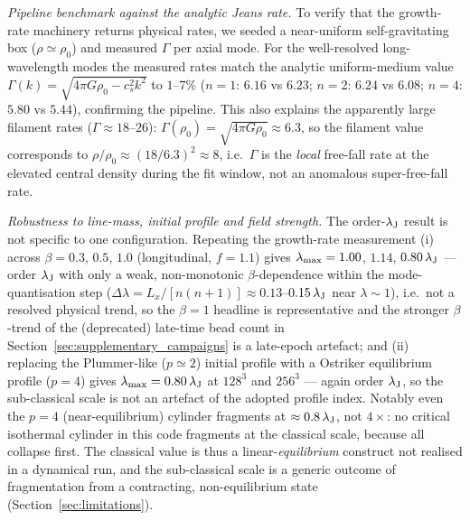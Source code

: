 \documentclass[usenatbib,twoside,twocolumn]{mnras}
\begin{document}
\emph{Pipeline benchmark against the analytic Jeans rate.} To verify that the growth-rate machinery returns physical rates, we seeded a near-uniform self-gravitating box ($\rho\simeq\rho_0$) and measured $\Gamma$ per axial mode. For the well-resolved long-wavelength modes the measured rates match the analytic uniform-medium value $\Gamma(k)=\sqrt{4\pi G\rho_0-c_s^2k^2}$ to $1$--$7\%$ ($n{=}1$: $6.16$ vs $6.23$; $n{=}2$: $6.24$ vs $6.08$; $n{=}4$: $5.80$ vs $5.44$), confirming the pipeline. This also explains the apparently large filament rates ($\Gamma\approx18$--$26$): $\Gamma(\rho_0)=\sqrt{4\pi G\rho_0}\approx6.3$, so the filament value corresponds to $\rho/\rho_0\approx(18/6.3)^2\approx8$, i.e.\ $\Gamma$ is the \emph{local} free-fall rate at the elevated central density during the fit window, not an anomalous super-free-fall rate.

\emph{Robustness to line-mass, initial profile and field strength.} The order-$\lambda_{\rm J}$ result is not specific to one configuration. Repeating the growth-rate measurement (i) across $\beta=0.3$, $0.5$, $1.0$ (longitudinal, $f=1.1$) gives $\lambda_{\rm max}=1.00$, $1.14$, $0.80\,\lambda_{\rm J}$ --- order $\lambda_{\rm J}$ with only a weak, non-monotonic $\beta$-dependence within the mode-quantisation step ($\Delta\lambda=L_x/[n(n{+}1)]\approx0.13$--$0.15\,\lambda_{\rm J}$ near $\lambda\sim1$), i.e.\ not a resolved physical trend, so the $\beta=1$ headline is representative and the stronger $\beta$-trend of the (deprecated) late-time bead count in Section~\ref{sec:supplementary_campaigns} is a late-epoch artefact; and (ii) replacing the Plummer-like ($p\simeq2$) initial profile with a Ostriker equilibrium profile ($p=4$) gives $\lambda_{\rm max}=0.80\,\lambda_{\rm J}$ at $128^3$ and $256^3$ --- again order $\lambda_{\rm J}$, so the sub-classical scale is not an artefact of the adopted profile index. Notably even the $p=4$ (near-equilibrium) cylinder fragments at $\approx0.8\,\lambda_{\rm J}$, not $4\times$: no critical isothermal cylinder in this code fragments at the classical scale, because all collapse first. The classical value is thus a linear-\emph{equilibrium} construct not realised in a dynamical run, and the sub-classical scale is a generic outcome of fragmentation from a contracting, non-equilibrium state (Section~\ref{sec:limitations}).
\end{document}

